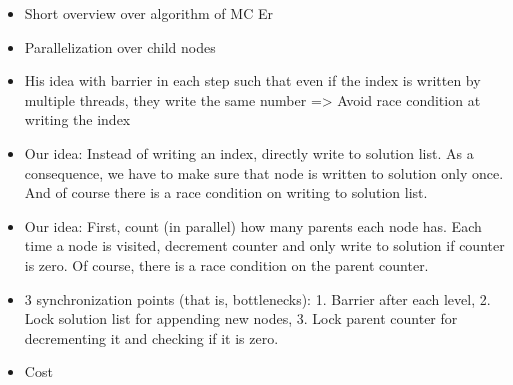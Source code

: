 \begin{invisible}
 \begin{itemize}
  \item Short overview over algorithm of MC Er
  \item Parallelization over child nodes
  \item His idea with barrier in each step such that even if the index is written by multiple threads, they write the same number => Avoid race condition at writing the index
  \item Our idea: Instead of writing an index, directly write to solution list. As a consequence, we have to make sure that node is written to solution only once. And of course there is a race condition on writing to solution list.
  \item Our idea: First, count (in parallel) how many parents each node has. Each time a node is visited, decrement counter and only write to solution if counter is zero. Of course, there is a race condition on the parent counter.
  \item 3 synchronization points (that is, bottlenecks): 1. Barrier after each level, 2. Lock solution list for appending new nodes, 3. Lock parent counter for decrementing it and checking if it is zero.
  \item Cost
 \end{itemize}

 
\end{invisible}
